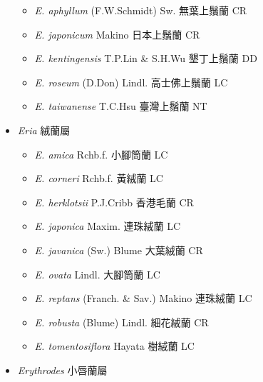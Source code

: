 \begin{itemize}
  \begin{itemize}
        \item[] \textit{E. aphyllum} (F.W.Schmidt) Sw.  無葉上鬚蘭   CR
        \item[] \textit{E. japonicum} Makino  日本上鬚蘭   CR
        \item[] \textit{E. kentingensis} T.P.Lin \& S.H.Wu  墾丁上鬚蘭   DD
        \item[] \textit{E. roseum} (D.Don) Lindl.  高士佛上鬚蘭   LC
        \item[] \textit{E. taiwanense} T.C.Hsu  臺灣上鬚蘭   NT
  \end{itemize}
 \item[] \textit{Eria} 絨蘭屬
                                
  \begin{itemize}
        \item[] \textit{E. amica} Rchb.f.  小腳筒蘭   LC
        \item[] \textit{E. corneri} Rchb.f.  黃絨蘭   LC
        \item[] \textit{E. herklotsii} P.J.Cribb  香港毛蘭   CR
        \item[] \textit{E. japonica} Maxim.  連珠絨蘭   LC
        \item[] \textit{E. javanica} (Sw.) Blume  大葉絨蘭   CR
        \item[] \textit{E. ovata} Lindl.  大腳筒蘭   LC
        \item[] \textit{E. reptans} (Franch. \& Sav.) Makino  連珠絨蘭   LC
        \item[] \textit{E. robusta} (Blume) Lindl.  細花絨蘭   CR
        \item[] \textit{E. tomentosiflora} Hayata  樹絨蘭   LC
  \end{itemize}
 \item[] \textit{Erythrodes} 小唇蘭屬
                                

\end{itemize}
